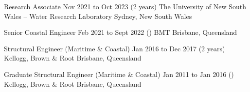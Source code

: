 	\entrytable%
	{Research Associate}
	{Nov 2021 to Oct 2023}
	{(2 years)}
	{The University of New South Wales -- Water Research Laboratory}
	{Sydney, New South Wales}
	{\vspace{-3\parskip}
	}

	\entrytable%
	{Senior Coastal Engineer}
	{Feb 2021 to Sept 2022}
	{()}
	{BMT}
	{Brisbane, Queensland}
	{
	\vspace{-3\parskip}
	}

	\entrytable%
	{Structural Engineer (Maritime \& Coastal)}
	{Jan 2016 to Dec 2017}
	{(2 years)}
	{Kellogg, Brown \& Root}
	{Brisbane, Queensland}
	{\vspace{-3\parskip}}

	\entrytable%
	{Graduate Structural Engineer (Maritime \& Coastal)}
	{Jan 2011 to Jan 2016}
	{()}
	{Kellogg, Brown \& Root}
	{Brisbane, Queensland}
	{\vspace{-3\parskip}}
